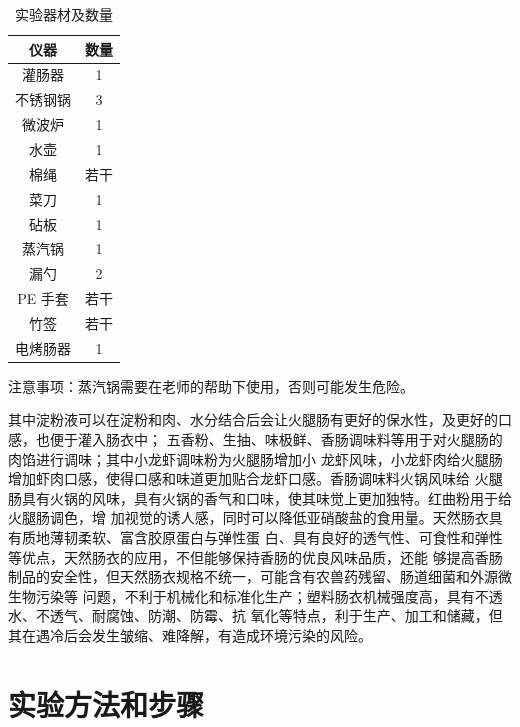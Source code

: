 \documentclass[UTF8]{ctexart}
\begin{document}
\begin{table}[!htb]
\begin{minipage}[h]{0.36\linewidth}
        \end{minipage}
		\begin{minipage}{0.24\linewidth}
		\centering
        \caption{实验器材及数量}
        \begin{tabular}{cc}
            \toprule
            仪器 & 数量\\
            \midrule
            灌肠器 & 1\\
			不锈钢锅 & 3\\
			微波炉 & 1\\
			水壶 & 1\\
			棉绳 & 若干\\
			菜刀 & 1\\
			砧板 & 1\\
			蒸汽锅 & 1\\
			漏勺 & 2\\
			PE 手套 & 若干\\
			竹签 & 若干\\
			电烤肠器 & 1\\
            \bottomrule
        \end{tabular}
		\end{minipage}
    \end{table}

	注意事项：蒸汽锅需要在老师的帮助下使用，否则可能发生危险。

	其中淀粉液可以在淀粉和肉、水分结合后会让火腿肠有更好的保水性，及更好的口感，也便于灌入肠衣中；
	五香粉、生抽、味极鲜、香肠调味料等用于对火腿肠的肉馅进行调味；其中小龙虾调味粉为火腿肠增加小
	龙虾风味，小龙虾肉给火腿肠增加虾肉口感，使得口感和味道更加贴合龙虾口感。香肠调味料火锅风味给
	火腿肠具有火锅的风味，具有火锅的香气和口味，使其味觉上更加独特。红曲粉用于给火腿肠调色，增
	加视觉的诱人感，同时可以降低亚硝酸盐的食用量。天然肠衣具有质地薄韧柔软、富含胶原蛋白与弹性蛋
	白、具有良好的透气性、可食性和弹性等优点，天然肠衣的应用，不但能够保持香肠的优良风味品质，还能
	够提高香肠制品的安全性，但天然肠衣规格不统一，可能含有农兽药残留、肠道细菌和外源微生物污染等
	问题，不利于机械化和标准化生产；塑料肠衣机械强度高，具有不透水、不透气、耐腐蚀、防潮、防霉、抗
	氧化等特点，利于生产、加工和储藏，但其在遇冷后会发生皱缩、难降解，有造成环境污染的风险。

	\section{实验方法和步骤}
\end{document}
